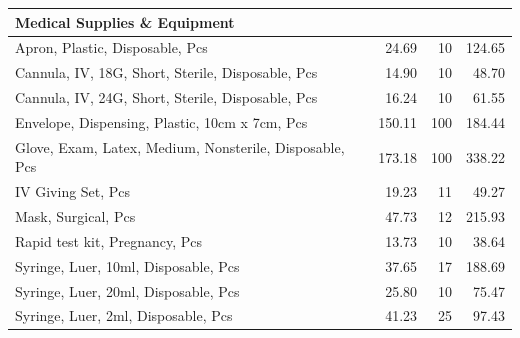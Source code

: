 \documentclass[12pt]{article}
\begin{document}
\begin{table}
\begin{tabular}{p{8cm} r r r}
\midrule
\multicolumn{4}{l}{\textbf{Medical Supplies \& Equipment}\hfill} \\
\midrule
Apron, Plastic, Disposable, Pcs & 24.69 & 10 & 124.65 \\
Cannula, IV, 18G, Short, Sterile, Disposable, Pcs & 14.90 & 10 & 48.70 \\
Cannula, IV, 24G, Short, Sterile, Disposable, Pcs & 16.24 & 10 & 61.55 \\
Envelope, Dispensing, Plastic, 10cm x 7cm, Pcs & 150.11 & 100 & 184.44 \\
Glove, Exam, Latex, Medium, Nonsterile, Disposable, Pcs & 173.18 & 100 & 338.22 \\
IV Giving Set, Pcs & 19.23 & 11 & 49.27 \\
Mask, Surgical, Pcs & 47.73 & 12 & 215.93 \\
Rapid test kit, Pregnancy, Pcs & 13.73 & 10 & 38.64 \\
Syringe, Luer, 10ml, Disposable, Pcs & 37.65 & 17 & 188.69 \\
Syringe, Luer, 20ml, Disposable, Pcs & 25.80 & 10 & 75.47 \\
Syringe, Luer, 2ml, Disposable, Pcs & 41.23 & 25 & 97.43 \\
\bottomrule
\end{tabular}
\end{table}
\end{document}
